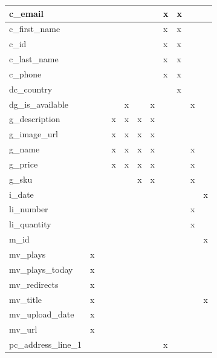 \documentclass[11pt, a4paper]{report}
\begin{document}
\begin{longtable}{|l|l|l|l|l|l|l|l|l|l|l|}
c\_email                &   &   &   &   &   &   & x & x &   &   \\ \hline
c\_first\_name          &   &   &   &   &   &   & x & x &   &   \\ \hline
c\_id                   &   &   &   &   &   &   & x & x &   &   \\ \hline
c\_last\_name           &   &   &   &   &   &   & x & x &   &   \\ \hline
c\_phone                &   &   &   &   &   &   & x & x &   &   \\ \hline
dc\_country             &   &   &   &   &   &   &   & x &   &   \\ \hline
dg\_is\_available       &   &   &   & x &   & x &   &   & x &   \\ \hline
g\_description          &   &   & x & x & x & x &   &   &   &   \\ \hline
g\_image\_url           &   &   & x & x & x & x &   &   &   &   \\ \hline
g\_name                 &   &   & x & x & x & x &   &   & x &   \\ \hline
g\_price                &   &   & x & x & x & x &   &   & x &   \\ \hline
g\_sku                  &   &   &   &   & x & x &   &   & x &   \\ \hline
i\_date                 &   &   &   &   &   &   &   &   &   & x \\ \hline
li\_number              &   &   &   &   &   &   &   &   & x &   \\ \hline
li\_quantity            &   &   &   &   &   &   &   &   & x &   \\ \hline
m\_id                   &   &   &   &   &   &   &   &   &   & x \\ \hline
mv\_plays               & x &   &   &   &   &   &   &   &   &   \\ \hline
mv\_plays\_today        & x &   &   &   &   &   &   &   &   &   \\ \hline
mv\_redirects           & x &   &   &   &   &   &   &   &   &   \\ \hline
mv\_title               & x &   &   &   &   &   &   &   &   & x \\ \hline
mv\_upload\_date        & x &   &   &   &   &   &   &   &   &   \\ \hline
mv\_url                 & x &   &   &   &   &   &   &   &   &   \\ \hline
pc\_address\_line\_1    &   &   &   &   &   &   & x &   &   &   \\ \hline

\end{longtable}
\end{document}
